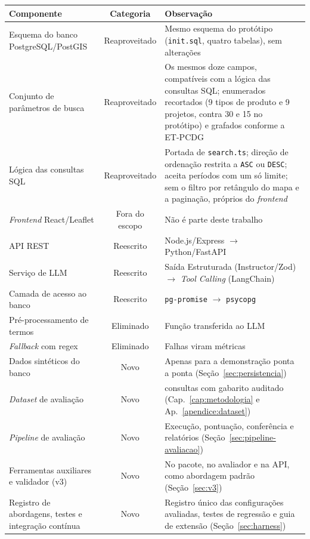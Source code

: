 \begin{quadro}[h]
\centering
\caption{Classificação dos componentes do sistema final em relação ao protótipo}
\label{quadro:componentes}
\small
\begin{tabular}{|>{\raggedright\arraybackslash}p{4cm}|c|>{\raggedright\arraybackslash}p{6.5cm}|}
\hline
\textbf{Componente} & \textbf{Categoria} & \textbf{Observação} \\
\hline
Esquema do banco PostgreSQL/PostGIS & Reaproveitado & Mesmo esquema do protótipo (\texttt{init.sql}, quatro tabelas), sem alterações \\
\hline
Conjunto de parâmetros de busca & Reaproveitado & Os mesmos doze campos, compatíveis com a lógica das consultas SQL; enumerados recortados (9 tipos de produto e 9 projetos, contra 30 e 15 no protótipo) e grafados conforme a ET-PCDG \\
\hline
Lógica das consultas SQL & Reaproveitado & Portada de \texttt{search.ts}; direção de ordenação restrita a \texttt{ASC} ou \texttt{DESC}; aceita períodos com um só limite; sem o filtro por retângulo do mapa e a paginação, próprios do \textit{frontend} \\
\hline
\textit{Frontend} React/Leaflet & Fora do escopo & Não é parte deste trabalho \\
\hline
API REST & Reescrito & Node.js/Express $\to$ Python/FastAPI \\
\hline
Serviço de LLM & Reescrito & Saída Estruturada (Instructor/Zod) $\to$ \textit{Tool Calling} (LangChain) \\
\hline
Camada de acesso ao banco & Reescrito & \texttt{pg-promise} $\to$ \texttt{psycopg} \\
\hline
Pré-processamento de termos & Eliminado & Função transferida ao LLM \\
\hline
\textit{Fallback} com regex & Eliminado & Falhas viram métricas \\
\hline
Dados sintéticos do banco & Novo & Apenas para a demonstração ponta a ponta (Seção~\ref{sec:persistencia}) \\
\hline
\textit{Dataset} de avaliação & Novo & 310 consultas com gabarito auditado (Cap.~\ref{cap:metodologia} e Ap.~\ref{apendice:dataset}) \\
\hline
\textit{Pipeline} de avaliação & Novo & Execução, pontuação, conferência e relatórios (Seção~\ref{sec:pipeline-avaliacao}) \\
\hline
Ferramentas auxiliares e validador (v3) & Novo & No pacote, no avaliador e na API, como abordagem padrão (Seção~\ref{sec:v3}) \\
\hline
Registro de abordagens, testes e integração contínua & Novo & Registro único das configurações avaliadas, testes de regressão e guia de extensão (Seção~\ref{sec:harness}) \\
\hline
\end{tabular}%
\end{quadro}

